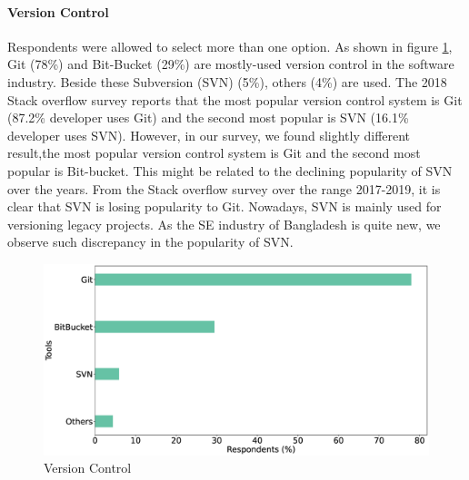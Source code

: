 \paragraph{Version Control}
Respondents were allowed to select more than one option. As shown in figure \ref{fig:versionControl}, Git (78\%) and Bit-Bucket (29\%) are mostly-used version control in the software industry. Beside these Subversion (SVN) (5\%), others (4\%) are used.  The 2018 Stack overflow survey\cite{StackoverflowSurvey2018} reports that  the most popular version control system is Git (87.2\% developer uses Git) and the second most popular is SVN (16.1\% developer uses SVN). However, in our survey, we found slightly different result,the most popular version control system is Git and the second most popular is Bit-bucket. This might be related to the declining popularity of SVN over the years. From the Stack overflow survey over the range 2017-2019, it is clear that SVN is losing popularity to Git. Nowadays, SVN is mainly used for versioning legacy projects. As the SE industry of Bangladesh is quite new, we observe such discrepancy in the popularity of SVN.

\begin{figure}[h]
\centering
  \includegraphics[scale=0.16]{Figures/Respondents_version_control}
  \caption{Version Control}
  \label{fig:versionControl}
\end{figure}

